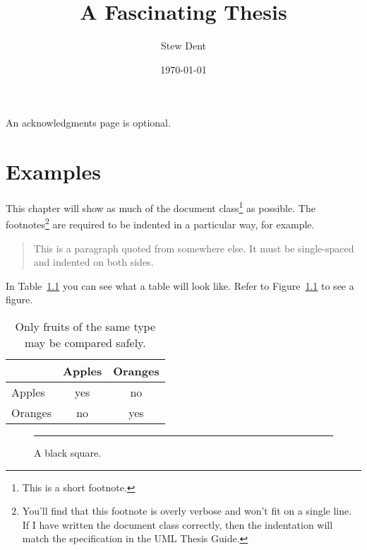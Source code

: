 \documentclass{umlthesis}
\title{A Fascinating Thesis}
\author{Stew Dent}
\date{\today}
\begin{document}
\maketitle

\begin{acknowledgments}
An acknowledgments page is optional.
\end{acknowledgments}

\tableofcontents
\listoffigures
\listoftables

\chapter{Examples}
This chapter will show as much of the document class\footnote{This is a short footnote.} as possible. The footnotes\footnote{You'll find that this footnote is overly verbose and won't fit on a single line. If I have written the document class correctly, then the indentation will match the specification in the UML Thesis Guide.} are required to be indented in a particular way, for example.

\begin{quote}
  This is a paragraph quoted from somewhere else. It must be single-spaced and indented on both sides.
\end{quote}

In Table~\ref{tab:fruits} you can see what a table will look like. Refer to Figure~\ref{fig:square} to see a figure.

\begin{table}[h]
  \centering
  \caption[Comparison of fruits]{Only fruits of the same type may be compared safely.}
  \label{tab:fruits}
  \begin{tabular}{l|cc}
    & Apples & Oranges \\
    \hline
    Apples & yes & no \\
    Oranges & no & yes \\
  \end{tabular}
\end{table}

\lipsum[1]

\begin{figure}
  \centering
  \rule{2in}{2in}
  \caption{A black square.}
  \label{fig:square}
\end{figure}
\end{document}
